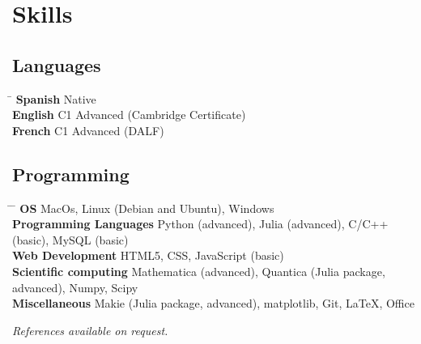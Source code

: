 \documentclass[10pt]{article} %
\begin{document}
\section{Skills}

\subsection{Languages}
\vspace{-0.5cm}
\parbox{\textwidth}{
\begin{tabbing}
\hspace{3cm} \= \kill
\textbf{Spanish} \> Native \\
\textbf{English} \> C1 Advanced (Cambridge Certificate) \\
\textbf{French} \> C1 Advanced (DALF) \\
\end{tabbing}}
\vspace{-1cm}

\subsection{Programming}
\vspace{-0.5cm}
\parbox{\textwidth}{
\begin{tabbing}
\hspace{5cm} \= \hspace{8cm} \=  \kill %
\textbf{OS} \> MacOs, Linux (Debian and Ubuntu), Windows \\ 
\textbf{Programming Languages} \> Python (advanced), Julia (advanced), C/C++ (basic), MySQL (basic)  \\ 
\textbf{Web Development} \> HTML5, CSS, JavaScript (basic)  \\ 
\textbf{Scientific computing} \> Mathematica (advanced), Quantica (Julia package, advanced), Numpy, Scipy \\ 
\textbf{Miscellaneous} \> Makie (Julia package, advanced), matplotlib, Git, \LaTeX, Office  \\ 
\end{tabbing}}
\vspace{-0.5cm}
\vspace{-1cm}


\vspace{1cm}
\begin{center}
\textit{References available on request.}
\end{center}
\end{document}
